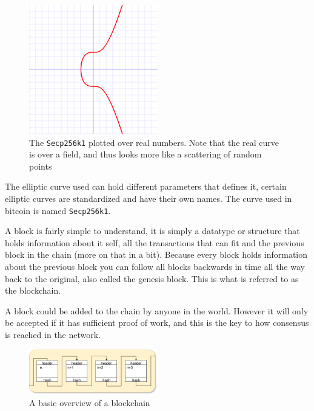 \begin{figure}[H]
	\centering
	\includegraphics[width=0.5\textwidth]{introduction/images/Secp256k1.png}
	\caption{The \texttt{Secp256k1} plotted over real numbers. Note that the real curve is over a field, and thus looks more like a scattering of random points}
	\label{fig:eccbasic}
\end{figure}

The elliptic curve used can hold different parameters that defines it, certain elliptic curves are standardized and have their own names. The curve used in bitcoin is named \texttt{Secp256k1}.\cite{Secp256k1_def}\cite{antonopoulos_2017}

A block is fairly simple to understand, it is simply a datatype or structure that holds information about it self, all the transactions that can fit and the previous block in the chain (more on that in a bit). Because every block holds information about the previous block you can follow all blocks backwards in time all the way back to the original, also called the genesis block.\cite{genesis} This is what is referred to as the blockchain. 

A block could be added to the chain by anyone in the world. However it will only be accepted if it has sufficient proof of work, and this is the key to how consensus is reached in the network.\cite{antonopoulos_2017}

\begin{figure}[H]
	\centering
	\includegraphics[width=0.5\textwidth]{introduction/images/blockchain.png}
	\caption{A basic overview of a blockchain}
	\label{fig:blockchain}
\end{figure}

